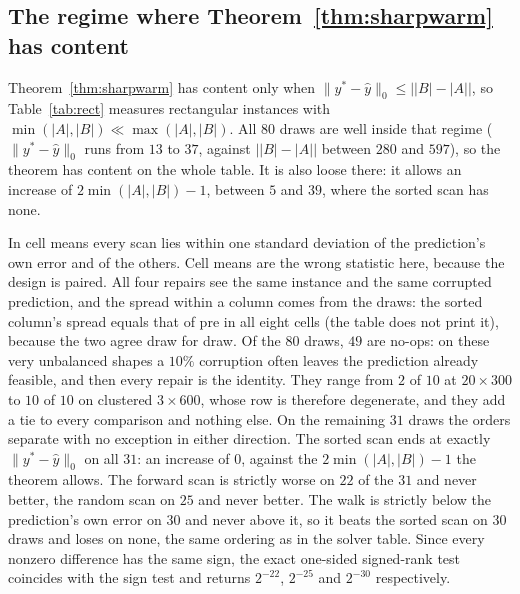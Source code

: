 \subsection*{The regime where Theorem~\ref{thm:sharpwarm} has content}

Theorem~\ref{thm:sharpwarm} has content only when
$\|y^* - \hat y\|_0 \le \bigl||B| - |A|\bigr|$, so Table~\ref{tab:rect} measures rectangular
instances with $\min(|A|,|B|) \ll \max(|A|,|B|)$. All $80$ draws are well inside that regime
($\|y^* - \hat y\|_0$ runs from $13$ to $37$, against $\bigl||B|-|A|\bigr|$ between $280$ and
$597$), so the theorem has content on the whole table. It is also loose there: it allows an
increase of $2\min(|A|,|B|)-1$, between $5$ and $39$, where the sorted scan has none.

In cell means every scan lies within one standard deviation of the
prediction's own error and of the others. Cell means are the wrong statistic here, because the
design is paired. All four
repairs see the same instance and the same corrupted prediction, and
the spread within a column comes from the draws: the sorted column's spread equals
that of pre in all eight cells (the table does not print it), because the two agree draw for draw.
Of the $80$ draws, $49$ are no-ops: on these very unbalanced
shapes a $10\%$ corruption often leaves the prediction already feasible, and then every repair is
the identity. They range from $2$ of $10$ at $20\times300$ to $10$ of $10$ on clustered
$3\times600$, whose row is therefore degenerate, and they add a tie to every comparison
and nothing else. On the remaining $31$ draws the orders separate with no exception in
either direction. The sorted scan ends at exactly $\|y^*-\hat y\|_0$ on all $31$: an increase
of $0$, against the $2\min(|A|,|B|)-1$ the theorem allows. The forward scan is strictly
worse on $22$ of the $31$ and never better, the random scan on $25$ and never better. The walk is
strictly below the prediction's own error on $30$ and never above it, so it beats the sorted scan
on $30$ draws and loses on none, the same ordering as in the solver table. Since every nonzero
difference has the same sign, the exact one-sided signed-rank test coincides with the sign test and
returns $2^{-22}$, $2^{-25}$ and $2^{-30}$ respectively.

